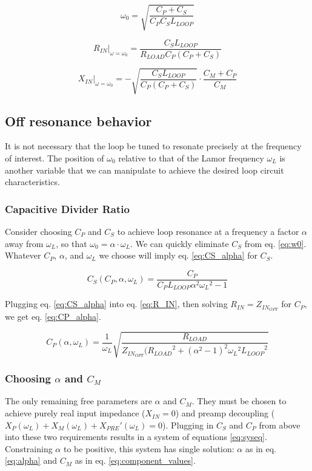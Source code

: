 \begin{equation} \label{eq:w0}
    \omega_0 = \sqrt{\frac{C_P+C_S}{C_P C_S L_{LOOP}}}
\end{equation}

\begin{equation} \label{eq:R_IN_RES}
    R_{IN}\big|_{\omega=\omega_0}= \frac{C_S L_{LOOP}}{R_{LOAD} C_P (C_P + C_S)}
\end{equation}

\begin{equation} \label{eq:X_IN_RES}
    X_{IN}\big|_{\omega=\omega_0}=-\sqrt{\frac{C_S L_{LOOP}}{C_P (C_P + C_S)}} \cdot \frac{C_M + C_P}{C_M}
\end{equation}

\subsection{Off resonance behavior}
It is not necessary that the loop be tuned to resonate precisely at the frequency of interest. The position of
$\omega_0$ relative to that of the Lamor frequency $\omega_L$ is another variable that we can manipulate to achieve the
desired loop circuit characteristics.

\subsubsection{Capacitive Divider Ratio}
Consider choosing $C_P$ and $C_S$ to achieve loop resonance at a frequency a factor $\alpha$ away from $\omega_L$, so
that $\omega_0 = \alpha\cdot\omega_L$. We can quickly eliminate $C_S$ from eq. \ref{eq:w0}. Whatever $C_P$, $\alpha$, and
$\omega_L$ we choose will imply eq. \ref{eq:CS_alpha} for $C_S$.

\begin{equation} \label{eq:CS_alpha}
    C_S(C_P,\alpha,\omega_L) = \frac{C_P}{C_P L_{LOOP} \alpha^2 {\omega_L}^2 -1}
\end{equation}

Plugging eq. \ref{eq:CS_alpha} into eq. \ref{eq:R_IN}, then solving $R_{IN} = Z_{IN_{OPT}}$ for $C_P$, we get eq.
\ref{eq:CP_alpha}.

\begin{equation} \label{eq:CP_alpha}
    C_P(\alpha,\omega_L) = \frac{1}{\omega_L}\sqrt{\frac{R_{LOAD}}{Z_{IN_{OPT}} ( {R_{LOAD}}^2 + (\alpha^2-1)^2 {\omega_L}^2
    {L_{LOOP}}^2}}
\end{equation}

\subsubsection{Choosing $\alpha$ and $C_M$}
The only remaining free parameters are $\alpha$ and $C_M$.  They must be chosen to achieve purely real input impedance
($X_{IN} = 0$) and preamp decoupling ($X_P(\omega_L) + X_M(\omega_L) +{X_{PRE}}'(\omega_L) = 0$). Plugging in $C_S$ and
$C_P$ from above into these two requirements results in a system of equations \ref{eq:syseq}. Constraining $\alpha$ to
be positive, this system has single solution: $\alpha$ as in eq. \ref{eq:alpha} and $C_M$ as in eq.
\ref{eq:component_values}.

